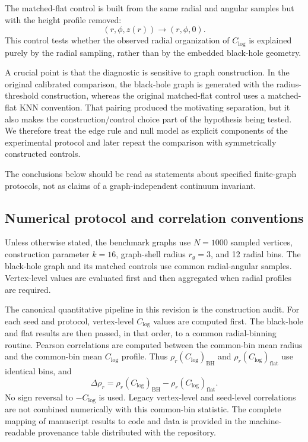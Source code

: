 \documentclass[11pt,a4paper]{article}
\begin{document}
The matched-flat control is built from the same radial and angular samples but with the height profile removed:
\begin{equation}
    (r,\phi,z(r))
    \longrightarrow
    (r,\phi,0).
\end{equation}
This control tests whether the observed radial organization of $C_{\log}$ is explained purely by the radial sampling, rather than by the embedded black-hole geometry.

A crucial point is that the diagnostic is sensitive to graph construction. In the original calibrated comparison, the black-hole graph is generated with the radius-threshold construction, whereas the original matched-flat control uses a matched-flat KNN convention. That pairing produced the motivating separation, but it also makes the construction/control choice part of the hypothesis being tested. We therefore treat the edge rule and null model as explicit components of the experimental protocol and later repeat the comparison with symmetrically constructed controls.

The conclusions below should be read as statements about specified finite-graph protocols, not as claims of a graph-independent continuum invariant.

\subsection{Numerical protocol and correlation conventions}
\label{sec:numerical-protocol}

Unless otherwise stated, the benchmark graphs use $N=1000$ sampled vertices, construction parameter $k=16$, graph-shell radius $r_g=3$, and 12 radial bins. The black-hole graph and its matched controls use common radial-angular samples. Vertex-level values are evaluated first and then aggregated when radial profiles are required.

The canonical quantitative pipeline in this revision is the construction audit. For each seed and protocol, vertex-level $C_{\log}$ values are computed first. The black-hole and flat results are then passed, in that order, to a common radial-binning routine. Pearson correlations are computed between the common-bin mean radius and the common-bin mean $C_{\log}$ profile. Thus $\rho_r(C_{\log})_{\mathrm{BH}}$ and $\rho_r(C_{\log})_{\mathrm{flat}}$ use identical bins, and
\begin{equation}
\Delta\rho_r=\rho_r(C_{\log})_{\mathrm{BH}}-\rho_r(C_{\log})_{\mathrm{flat}}.
\end{equation}
No sign reversal to $-C_{\log}$ is used. Legacy vertex-level and seed-level correlations are not combined numerically with this common-bin statistic. The complete mapping of manuscript results to code and data is provided in the machine-readable provenance table distributed with the repository.
\end{document}

